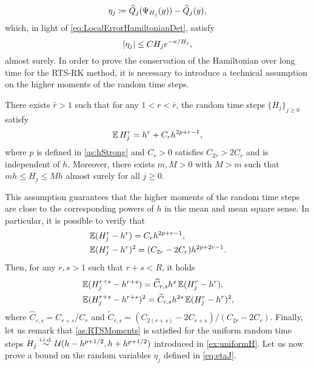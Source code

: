 \documentclass[10pt]{article}
\begin{document}
\begin{equation}\label{eq:etaJ}
	\eta_j \coloneqq \widehat Q_j(\Psi_{H_j}(y)) - \widehat Q_j(y),
\end{equation} 
which, in light of \eqref{eq:LocalErrorHamiltonianDet}, satisfy 
\begin{equation}\label{eq:BoundEtaJ}
\lvert\eta_j\rvert \leq C H_j e^{-\kappa / H_j},
\end{equation}
almost surely. In order to prove the conservation of the Hamiltonian over long time for the RTS-RK method, it is necessary to introduce a technical assumption on the higher moments of the random time steps.
\begin{assumption}\label{as:RTSMoments} There exists $\bar r > 1$ such that for any $1 < r < \bar r$, the random time steps $\{H_j\}_{j\geq 0}$ satisfy
	\begin{equation}
	\operatorname{\mathbb{E}} H_j^r = h^r + C_rh^{2p+r-1},
	\end{equation}
	where $p$ is defined in \cref{as:hStrong} and $C_r > 0$ satisfies $C_{2r} > 2C_r$ and is independent of $h$. Moreover, there exists $m, M > 0$ with $M > m$ such that $mh \leq H_j \leq Mh$ almost surely for all $j \geq 0$.
\end{assumption}
This assumption guarantees that the higher moments of the random time steps are close to the corresponding powers of $h$ in the mean and mean square sense. In particular, it is possible to verify that
\begin{equation}
\begin{aligned}
	&\operatorname{\mathbb{E}}(H_j^r - h^r) = C_r h^{2p+r-1},\\
	&\operatorname{\mathbb{E}}(H_j^r - h^r)^2 = (C_{2r} - 2C_r) h^{2p+2r-1}.
\end{aligned}
\end{equation}
Then, for any $r, s > 1$ such that $r + s < R$, it holds
\begin{equation}\label{eq:higherHigherMoments}
\begin{aligned}
	&\operatorname{\mathbb{E}}(H_j^{r+s} - h^{r+s}) = \widehat C_{r,s} h^s \operatorname{\mathbb{E}}(H_j^r - h^r),\\
	&\operatorname{\mathbb{E}}(H_j^{r+s} - h^{r+s})^2 = \widetilde C_{r,s} h^{2s} \operatorname{\mathbb{E}}(H_j^r - h^r)^2,
\end{aligned}
\end{equation}
where $\hat C_{r,s} = C_{r+s}/C_r$ and $\tilde C_{r,s} = (C_{2(r+s)} - 2C_{r+s})/(C_{2r} - 2C_r)$. Finally, let us remark that \cref{as:RTSMoments} is satisfied for the uniform random time steps $H_j \stackrel{\text{i.i.d.}}{\sim} \mathcal U(h-h^{p+1/2}, h+h^{p+1/2})$ introduced in \cref{ex:uniformH}. Let us now prove a bound on the random variables $\eta_j$ defined in \eqref{eq:etaJ}.
\end{document}
